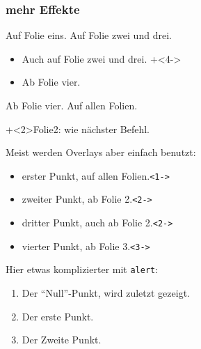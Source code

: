 \documentclass[usepdftitle=false, t]{beamer}
\begin{document}
\begin{frame}
  \frametitle{mehr Effekte}
  Auf Folie eins.
  Auf Folie zwei und drei.
  \begin{itemize}
    \item Auch auf Folie zwei und drei.
    \onslide+<4->
    \item Ab Folie vier.
  \end{itemize}
  Ab Folie vier.
  \onslide
  Auf allen Folien.
  \bvskip

  \bvskip


  \onslide+<2>{Folie2: wie nächster Befehl.}

\end{frame}

\begin{frame}
  Meist werden Overlays aber einfach benutzt:
  \begin{itemize}
   \item<1-> erster Punkt, auf allen Folien.\hfill{\small\texttt{<1->}}
   \item<2-> zweiter Punkt, ab Folie 2.\hfill{\small\texttt{<2->}}
   \item<2-> dritter Punkt, auch ab Folie 2.\hfill{\small\texttt{<2->}}
   \item<3-> vierter Punkt, ab Folie 3.\hfill{\small\texttt{<3->}}
  \end{itemize}
  \bvskip

  Hier etwas komplizierter mit \texttt{alert}:
  \begin{enumerate}
    \item<3-| alert@3>[0.] Der "`Null"'-Punkt, wird zuletzt gezeigt.
    \item<1-| alert@1> Der erste Punkt.
    \item<2-| alert@2> Der Zweite Punkt.
  \end{enumerate}
\end{frame}
\end{document}
